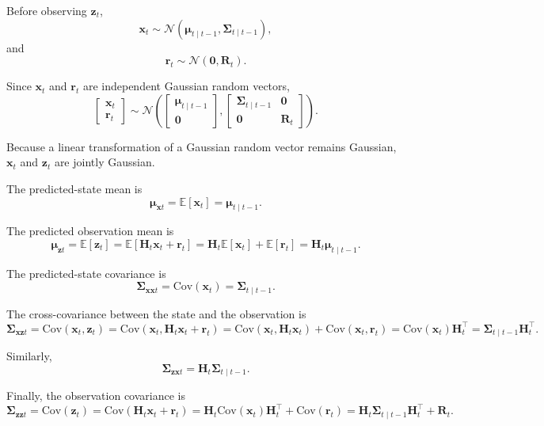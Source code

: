 \documentclass[../Bayesian_Inference.tex]{subfiles}
\begin{document}
Before observing $\bm{z}_t$,
\[
    \bm{x}_t\sim\mathcal{N}\left(\bm{\mu}_{t\mid t-1},\mathbf{\Sigma}_{t\mid t-1}\right),
\]
and
\[
    \bm{r}_t \sim \mathcal{N}\left(\bm{0},\mathbf{R}_t\right).
\]

Since $\bm{x}_t$ and $\bm{r}_t$ are independent Gaussian random vectors,
\[
    \begin{bmatrix}
        \bm{x}_t \\
        \bm{r}_t
    \end{bmatrix}
    \sim
    \mathcal{N}\left(
        \begin{bmatrix}
            \bm{\mu}_{t\mid t-1} \\
            \bm{0}
        \end{bmatrix},
        \begin{bmatrix}
            \mathbf{\Sigma}_{t\mid t-1} & \mathbf{0} \\
            \mathbf{0} & \mathbf{R}_t
        \end{bmatrix}
    \right).
\]

Because a linear transformation of a Gaussian random vector remains Gaussian, $\bm{x}_t$ and $\bm{z}_t$ are jointly Gaussian.

The predicted-state mean is
\[
    \bm{\mu}_{\bm{x}t} = \mathbb{E}[\bm{x}_t] = \bm{\mu}_{t\mid t-1}.
\]

The predicted observation mean is
\[
    \bm{\mu}_{\bm{z}t} = \mathbb{E}[\bm{z}_t] = \mathbb{E}[\mathbf{H}_t\bm{x}_t+\bm{r}_t] = \mathbf{H}_t\mathbb{E}[\bm{x}_t]+\mathbb{E}[\bm{r}_t] = \mathbf{H}_t\bm{\mu}_{t\mid t-1}.
\]

The predicted-state covariance is
\[
    \mathbf{\Sigma}_{\bm{x}\bm{x}t} = \mathrm{Cov}(\bm{x}_t) = \mathbf{\Sigma}_{t\mid t-1}.
\]

The cross-covariance between the state and the observation is
\[
    \mathbf{\Sigma}_{\bm{x}\bm{z}t} = \mathrm{Cov}(\bm{x}_t,\bm{z}_t) = \mathrm{Cov}(\bm{x}_t,\mathbf{H}_t\bm{x}_t+\bm{r}_t) = \mathrm{Cov}(\bm{x}_t,\mathbf{H}_t\bm{x}_t) + \mathrm{Cov}(\bm{x}_t,\bm{r}_t) = \mathrm{Cov}(\bm{x}_t)\mathbf{H}_t^\top = \mathbf{\Sigma}_{t\mid t-1}\mathbf{H}_t^\top.
\]

Similarly,
\[
    \mathbf{\Sigma}_{\bm{z}\bm{x}t} = \mathbf{H}_t\mathbf{\Sigma}_{t\mid t-1}.
\]

Finally, the observation covariance is
\[
    \mathbf{\Sigma}_{\bm{z}\bm{z}t} = \mathrm{Cov}(\bm{z}_t) = \mathrm{Cov}(\mathbf{H}_t\bm{x}_t+\bm{r}_t) = \mathbf{H}_t\mathrm{Cov}(\bm{x}_t)\mathbf{H}_t^\top + \mathrm{Cov}(\bm{r}_t) = \mathbf{H}_t\mathbf{\Sigma}_{t\mid t-1}\mathbf{H}_t^\top + \mathbf{R}_t.
\]
\end{document}
